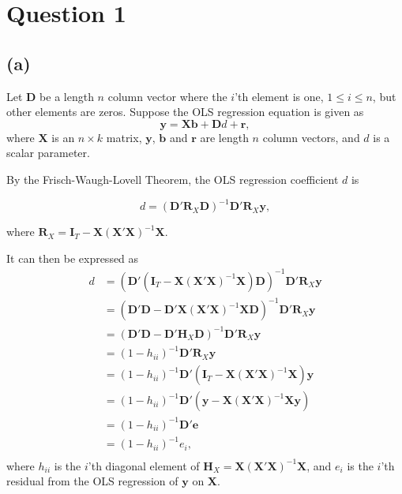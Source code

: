 \documentclass[
]{article}
\author{}
\date{\vspace{-2.5em}}
\begin{document}


\hypertarget{question-1}{%
\section{Question 1}\label{question-1}}

\hypertarget{a}{%
\subsection{(a)}\label{a}}

Let \(\boldsymbol{D}\) be a length \(n\) column vector where the
\(i\)'th element is one, \(1\leq i \leq n\), but other elements are
zeros. Suppose the OLS regression equation is given as
\[\boldsymbol{y} = \boldsymbol{X}\boldsymbol{b} + \boldsymbol{D}d + \boldsymbol{r},\]
where \(\boldsymbol{X}\) is an \(n \times k\) matrix,
\(\boldsymbol{y}\), \(\boldsymbol{b}\) and \(\boldsymbol{r}\) are length
\(n\) column vectors, and \(d\) is a scalar parameter.

By the Frisch-Waugh-Lovell Theorem, the OLS regression coefficient \(d\)
is

\[d = (\boldsymbol{D}'\boldsymbol{R}_X\boldsymbol{D})^{-1}\boldsymbol{D}'\boldsymbol{R}_X\boldsymbol{y},\]

where
\(\boldsymbol{R}_X = \boldsymbol{I}_T-\boldsymbol{X}(\boldsymbol{X}'\boldsymbol{X})^{-1}\boldsymbol{X}\).

It can then be expressed as \begin{align*}
d &= (\boldsymbol{D}'(\boldsymbol{I}_T-\boldsymbol{X}(\boldsymbol{X}'\boldsymbol{X})^{-1}\boldsymbol{X})\boldsymbol{D})^{-1}\boldsymbol{D}'\boldsymbol{R}_X\boldsymbol{y} \\
&= (\boldsymbol{D}'\boldsymbol{D}-\boldsymbol{D}'\boldsymbol{X}(\boldsymbol{X}'\boldsymbol{X})^{-1}\boldsymbol{X}\boldsymbol{D})^{-1}\boldsymbol{D}'\boldsymbol{R}_X\boldsymbol{y} \\
&= (\boldsymbol{D}'\boldsymbol{D}-\boldsymbol{D}'\boldsymbol{H}_X\boldsymbol{D})^{-1}\boldsymbol{D}'\boldsymbol{R}_X\boldsymbol{y} \\
&= (1-h_{ii})^{-1}\boldsymbol{D}'\boldsymbol{R}_X\boldsymbol{y} \\
&= (1-h_{ii})^{-1}\boldsymbol{D}'(\boldsymbol{I}_T -\boldsymbol{X}(\boldsymbol{X}'\boldsymbol{X})^{-1}\boldsymbol{X})\boldsymbol{y} \\
&= (1-h_{ii})^{-1}\boldsymbol{D}'(\boldsymbol{y} -\boldsymbol{X}(\boldsymbol{X}'\boldsymbol{X})^{-1}\boldsymbol{X}\boldsymbol{y}) \\
&= (1-h_{ii})^{-1}\boldsymbol{D}'\boldsymbol{e}\\
&= (1-h_{ii})^{-1}e_i,\\
\end{align*} where \(h_{ii}\) is the \(i\)'th diagonal element of
\(\boldsymbol{H}_X = \boldsymbol{X}(\boldsymbol{X}'\boldsymbol{X})^{-1}\boldsymbol{X}\),
and \(e_i\) is the \(i\)'th residual from the OLS regression of
\(\boldsymbol{y}\) on \(\boldsymbol{X}\).
\end{document}
